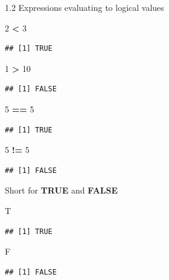 \documentclass[
  ignorenonframetext,
]{beamer}
\newenvironment{Shaded}{\begin{snugshade}}{\end{snugshade}}
\newcommand{\DecValTok}[1]{\textcolor[rgb]{0.00,0.00,0.81}{#1}}
\newcommand{\NormalTok}[1]{#1}
\newcommand{\SpecialCharTok}[1]{\textcolor[rgb]{0.81,0.36,0.00}{\textbf{#1}}}
\begin{document}
\begin{frame}[fragile]{1.2 Expressions evaluating to logical values}
\protect\hypertarget{expressions-evaluating-to-logical-values}{}
\begin{Shaded}
\begin{Highlighting}[]
\DecValTok{2} \SpecialCharTok{\textless{}} \DecValTok{3}   
\end{Highlighting}
\end{Shaded}

\begin{verbatim}
## [1] TRUE
\end{verbatim}

\begin{Shaded}
\begin{Highlighting}[]
\DecValTok{1} \SpecialCharTok{\textgreater{}} \DecValTok{10}  
\end{Highlighting}
\end{Shaded}

\begin{verbatim}
## [1] FALSE
\end{verbatim}

\begin{Shaded}
\begin{Highlighting}[]
\DecValTok{5} \SpecialCharTok{==} \DecValTok{5}   
\end{Highlighting}
\end{Shaded}

\begin{verbatim}
## [1] TRUE
\end{verbatim}

\begin{Shaded}
\begin{Highlighting}[]
\DecValTok{5} \SpecialCharTok{!=} \DecValTok{5}
\end{Highlighting}
\end{Shaded}

\begin{verbatim}
## [1] FALSE
\end{verbatim}
\end{frame}

\begin{frame}[fragile]
Short for \textbf{TRUE} and \textbf{FALSE}

\begin{Shaded}
\begin{Highlighting}[]
\NormalTok{T}
\end{Highlighting}
\end{Shaded}

\begin{verbatim}
## [1] TRUE
\end{verbatim}

\begin{Shaded}
\begin{Highlighting}[]
\NormalTok{F}
\end{Highlighting}
\end{Shaded}

\begin{verbatim}
## [1] FALSE
\end{verbatim}
\end{frame}
\end{document}
